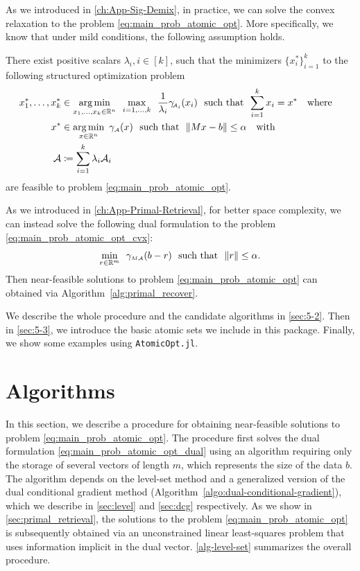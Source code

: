 As we introduced in \autoref{ch:App-Sig-Demix}, in practice, we can solve the convex relaxation to the problem \eqref{eq:main_prob_atomic_opt}. More specifically, we know that under mild conditions, the following assumption holds. 
\begin{assumption} \label{ass:atomic_opt}
There exist positive scalars $\lambda_i, i\in[k]$, such that the minimizers $\{x_i^*\}_{i=1}^k$ to the following structured optimization problem
\begin{equation} \label{eq:main_prob_atomic_opt_cvx} 
  \begin{split}
      x_1^*, \dots, x_k^* &\in \underset{x_1, \dots, x_k \in \mathbb{R}^n}{\textrm{arg}\,{\min}}\enskip \max_{i=1,\dots,k} \enspace \frac{1}{\lambda_i}\gamma_{\!\scriptscriptstyle\mathcal{A}_i}(x_i) \enspace\mathop{\hbox{\rm such that}}\enspace \sum_{i=1}^k x_i = x^* \hbox{\quad where\quad}\\
      x^* &\in \underset{x\in\mathbb{R}^n}{\textrm{arg}\,{\min}}\enskip \gamma_{\scriptscriptstyle\mathcal{A}}(x) \enspace\mathop{\hbox{\rm such that}}\enspace \|Mx- b\| \leq \alpha \hbox{\quad with\quad} \\
      \mathcal{A} &\coloneqq \sum_{i=1}^k \lambda_i\mathcal{A}_i
  \end{split}
\end{equation}
are feasible to problem \eqref{eq:main_prob_atomic_opt}. 
\end{assumption}

As we introduced in \autoref{ch:App-Primal-Retrieval}, for better space complexity, we can instead solve the following dual formulation to the problem \eqref{eq:main_prob_atomic_opt_cvx}:
\begin{equation} \label{eq:main_prob_atomic_opt_dual} 
    \min_{r\in\mathbb{R}^m}\enspace \gamma_{\scriptscriptstyle{M\mathcal{A}}}(b-r) \enspace\mathop{\hbox{\rm such that}}\enspace \|r\| \leq \alpha.
\end{equation}
Then near-feasible solutions to problem \eqref{eq:main_prob_atomic_opt} can obtained via Algorithm~\ref{alg:primal_recover}. 

We describe the whole procedure and the candidate algorithms in \autoref{sec:5-2}. Then in \autoref{sec:5-3}, we introduce the basic atomic sets we include in this package. Finally, we show some examples using \texttt{AtomicOpt.jl}. 


\section{Algorithms} \label{sec:5-2}

In this section, we describe a procedure for obtaining near-feasible solutions to problem \eqref{eq:main_prob_atomic_opt}. The procedure first solves the dual formulation \eqref{eq:main_prob_atomic_opt_dual} using an algorithm requiring only the storage of several vectors of length $m$, which represents the size of the data $b$. The algorithm depends on the level-set method \cite{berg2011sparse,berg2008probing} and a generalized version of the dual conditional gradient method (Algorithm~\ref{algo:dual-conditional-gradient}), which we describe in \autoref{sec:level} and \autoref{sec:dcg} respectively. As we show in \autoref{sec:primal_retrieval}, the solutions to the problem \eqref{eq:main_prob_atomic_opt} is subsequently obtained via an unconstrained linear least-squares problem that uses information implicit in the dual vector. \autoref{alg-level-set} summarizes the overall procedure. 

